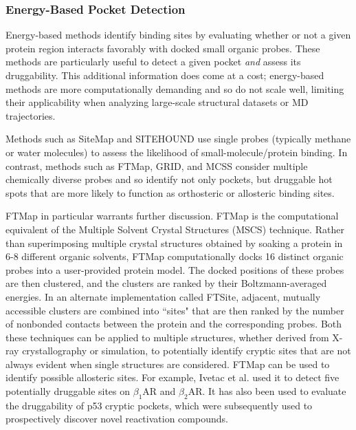 \subsubsection{Energy-Based Pocket Detection}
\par Energy-based methods identify binding sites by evaluating whether or not a given protein region interacts favorably with docked small organic probes. These methods are particularly useful to detect a given pocket \textit{and} assess its druggability. This additional information does come at a cost; energy-based methods are more computationally demanding and so do not scale well, limiting their applicability when analyzing large-scale structural datasets or MD trajectories.
\par Methods such as SiteMap\cite{Halgren2009a} and SITEHOUND\cite{Hernandez2009a} use single probes (typically methane or water molecules) to assess the likelihood of small-molecule/protein binding. In contrast, methods such as FTMap,\cite{Kozakov2011a,Kozakov2015a,Brenke2009a} GRID,\cite{Goodford1985a} and MCSS\cite{Miranker1991a} consider multiple chemically diverse probes and so identify not only pockets, but druggable hot spots that are more likely to function as orthosteric or allosteric binding sites.
\par FTMap\cite{Kozakov2011a,Kozakov2015a,Brenke2009a} in particular warrants further discussion. FTMap is the computational equivalent of the Multiple Solvent Crystal Structures (MSCS) technique.\cite{Allen1996,Mattos1996a} Rather than superimposing multiple crystal structures obtained by soaking a protein in 6-8 different organic solvents, FTMap computationally docks 16 distinct organic probes into a user-provided protein model. The docked positions of these probes are then clustered, and the clusters are ranked by their Boltzmann-averaged energies. In an alternate implementation called FTSite,\cite{Ngan2012a} adjacent, mutually accessible clusters are combined into ``sites" that are then ranked by the number of nonbonded contacts between the protein and the corresponding probes. Both these techniques can be applied to multiple structures, whether derived from X-ray crystallography or simulation, to potentially identify cryptic sites that are not always evident when single structures are considered. FTMap can be used to identify possible allosteric sites. For example, Ivetac et al. used it to detect five potentially druggable sites on \(\beta_1\)AR and \(\beta_2\)AR.\cite{Ivetac2010a,Ivetac2012} It has also been used to evaluate the druggability of p53 cryptic pockets, which were subsequently used to prospectively discover novel reactivation compounds.\cite{Wassman2013}
